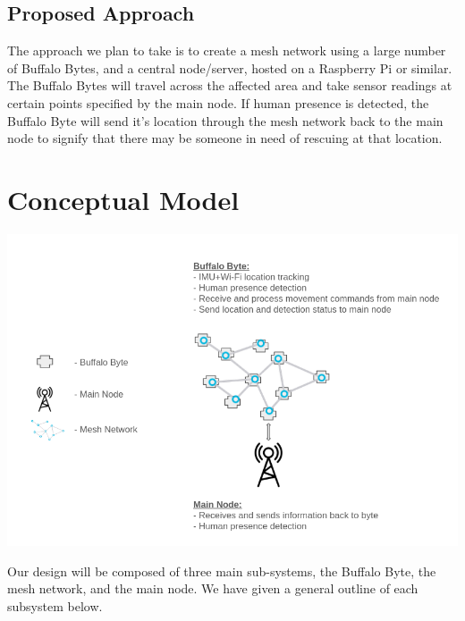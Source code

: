 \documentclass[10pt]{article}
\begin{document}
\subsection*{Proposed Approach}
The approach we plan to take is to create a mesh network using a large number of Buffalo Bytes, and a central node/server, hosted on a Raspberry Pi or similar. The Buffalo Bytes will travel across the affected area and take sensor readings at certain points specified by the main node. If human presence is detected, the Buffalo Byte will send it's location through the mesh network back to the main node to signify that there may be someone in need of rescuing at that location.

\section*{Conceptual Model}
\begin{center}
\includegraphics[scale=0.4]{conceptual-model}\\
\end{center}
Our design will be composed of three main sub-systems, the Buffalo Byte, the mesh network, and the main node. We have given a general outline of each subsystem below.
\end{document}
